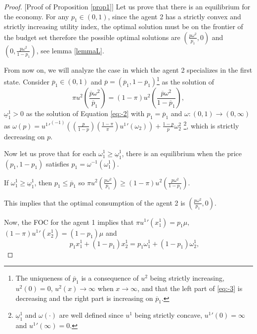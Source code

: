 \documentclass[pdftex]{article}
\numberwithin{equation}{section}
\theoremstyle{th}
\newtheorem{proof lemma}{{Proof Lemma}.}
\theoremstyle{definition}
\begin{document}
{\begin{proof}{[}Proof of Proposition \ref{prop1}{]} Let us prove
that there is an equilibrium for the economy. For any $p_{1}\in(0,1)$,
since the agent 2 has a strictly convex and strictly increasing utility
index, the optimal solution must be on the frontier of the budget
set therefore the possible optimal solutions are $\left(\frac{p\omega^{2}}{p_{1}},0\right)$
and $\left(0,\frac{p\omega^{2}}{1-p_{1}}\right)$, see lemma \ref{lemmaL}.

From now on, we will analyze the case in which the agent 2 specializes
in the first state. Consider $\overline{p}_{1}\in\left(0,1\right)$
and $\overline{p}=(\overline{p}_{1},1-\overline{p}_{1})$\footnote{The uniqueness of $\overline{p}_{1}$ is a consequence of $u^{2}$
being strictly increasing, $u^{2}(0)=0$, $u^{2}(x)\rightarrow\infty$
when $x\rightarrow\infty$, and that the left part of \ref{eq:-3}
is decreasing and the right part is increasing on $\overline{p}_{1}$.} as the solution of 
\begin{equation}
\pi u{}^{2}\left(\frac{\overline{p}\omega^{2}}{\overline{p}_{1}}\right)=\left(1-\pi\right)u^{2}\left(\frac{\overline{p}\omega^{2}}{1-\overline{p}_{1}}\right),\label{eq:-3}
\end{equation}
 $\underline{\omega}_{1}^{1}>0$ as the solution of Equation \ref{eq:-2}
with $p_{1}=\overline{p}_{1}$ and $\omega:(0,1)\rightarrow(0,\infty)$
as $\omega(p)={{u^{1}}'}^{\left(-1\right)}\!\!\left(\!\left(\frac{p}{1-p}\right)\!\!\left(\frac{1-\pi}{\pi}\right)\!{u^{1}}'\left(\omega_{2}\right)\right)+\frac{1-p}{p}\omega_{2}^{2}$ \footnote{$\underline{\omega}_{1}^{1}$ and $\omega(\cdot)$ are well defined
since $u^{1}$ being strictly concave, ${u^{1}}'(0)=\infty$ and ${u^{1}}'(\infty)=0$.}, which is strictly decreasing on $p$.

Now let us prove that for each $\omega_{1}^{1}\geq\underline{\omega}_{1}^{1}$,
there is an equilibrium when the price $(p_{1},1-p_{1})$ satisfies
$p_{1}=\omega^{-1}(\omega_{1}^{1})$.

If $\omega_{1}^{1}\geq\underline{\omega}_{1}^{1}$, then $p_{1}\leq\overline{p}_{1}$
so $\pi u{}^{2}\left(\frac{p\omega^{2}}{p_{1}}\right)\geq\left(1-\pi\right)u^{2}\left(\frac{p\omega^{2}}{1-p_{1}}\right).$

This implies that the optimal consumption of the agent 2 is $\left(\!\frac{p\omega^{2}}{p_{1}},\!0\!\right)$.

Now, the FOC for the agent 1 implies that $\pi{u^{1}}'\left(x_{1}^{1}\right)=p_{1}\mu,$
$\left(1-\pi\right){u^{1}}'\left(x_{2}^{1}\right)=\left(1-p_{1}\right)\mu$
and 
\begin{equation}
\ \ \ \ \ \ \ \ p_{1}x_{1}^{1}+\left(1-p_{1}\right)x_{2}^{1}=p_{1}\omega_{1}^{1}+\left(1-p_{1}\right)\omega_{2}^{1},\label{eq:-4}
\end{equation}


\end{proof}}
\end{document}
